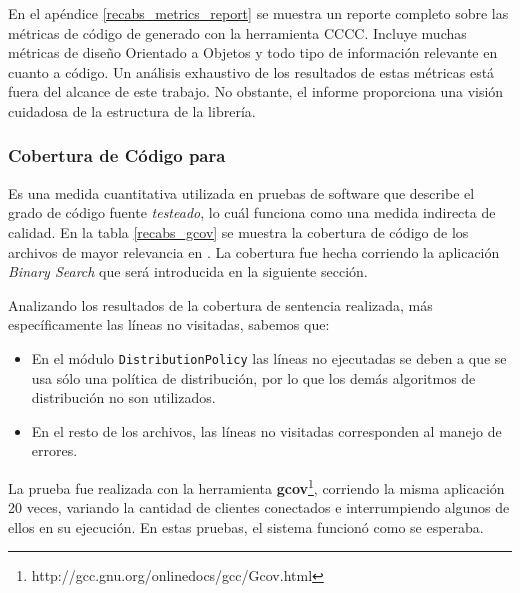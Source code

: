 En el apéndice \ref{recabs_metrics_report} se muestra un reporte completo sobre las métricas de código de \rc{} generado con la herramienta
CCCC. Incluye muchas métricas de diseño Orientado a Objetos y todo tipo de información relevante en cuanto a código. Un análisis exhaustivo
de los resultados de estas métricas está fuera del alcance de este trabajo. No obstante, el informe proporciona una visión cuidadosa de la
estructura de la librería.

\subsubsection{Cobertura de Código para \rc}
\label{cobertura_recabs}

Es una medida cuantitativa utilizada en pruebas de software que describe el grado de código fuente \textit{testeado}, lo cuál funciona como
una medida indirecta de calidad. En la tabla \ref{recabs_gcov} se muestra la cobertura de código de los archivos de mayor relevancia en
\rc. La cobertura fue hecha corriendo la aplicación \textit{Binary Search} que será introducida en la siguiente sección.

Analizando los resultados de la cobertura de sentencia realizada, más específicamente las líneas no visitadas, sabemos que:
\begin{itemize}
    \item   En el módulo \texttt{DistributionPolicy} las líneas no ejecutadas se deben a que se usa sólo una política de distribución, por
            lo que los demás algoritmos de distribución no son utilizados.
    \item   En el resto de los archivos, las líneas no visitadas corresponden al manejo de errores.
\end{itemize}

La prueba fue realizada con la herramienta \textbf{gcov}\footnote{http://gcc.gnu.org/onlinedocs/gcc/Gcov.html}, corriendo la misma
aplicación 20 veces, variando la cantidad de clientes conectados e interrumpiendo algunos de ellos en su ejecución. En estas pruebas, el
sistema funcionó como se esperaba.

